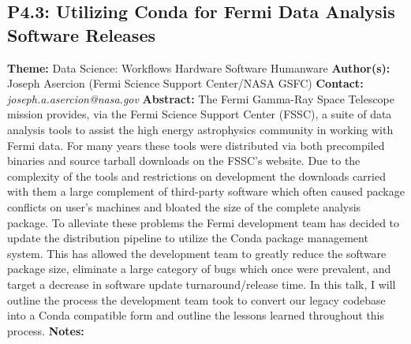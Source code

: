 \documentclass{report}
\begin{document}
{{{{{{{{{{{\subsection*{P4.3: Utilizing Conda for Fermi Data Analysis Software Releases}
{\bf Theme:}  Data Science: Workflows Hardware Software Humanware\newline
{\bf Author(s):}\newline
Joseph Asercion (Fermi Science Support Center/NASA GSFC) \newline   \newline   \newline   \newline  \newline  \newline\newline
{\bf Contact:} {\it joseph.a.asercion@nasa.gov}\newline
\newline\newline
{\bf Abstract:}\newline
The Fermi Gamma-Ray Space Telescope mission provides, via the Fermi Science Support Center (FSSC), a suite of data analysis tools to assist the high energy astrophysics community in working with Fermi data.  For many years these tools were distributed via both precompiled binaries and source tarball downloads on the FSSC’s website.  Due to the complexity of the tools and restrictions on development the downloads carried with them a large complement of third-party software which often caused package conflicts on user’s machines and bloated the size of the complete analysis package.  To alleviate these problems the Fermi development team has decided to update the distribution pipeline to utilize the Conda package management system.  This has allowed the development team to greatly reduce the software package size, eliminate a large category of bugs which once were prevalent, and target a decrease in software update turnaround/release time.  In this talk, I will outline the process the development team took to convert our legacy codebase into a Conda compatible form and outline the lessons learned throughout this process.\newline
{\bf Notes:}\newline
{\newpage
}}}}}}}}}}}}
\end{document}
